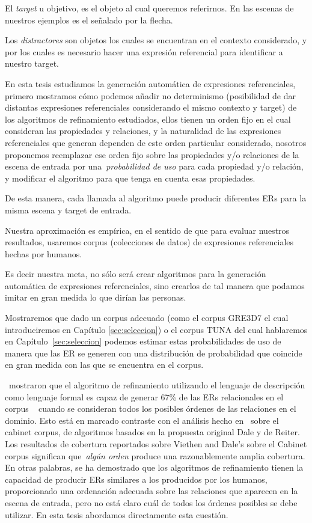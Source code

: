 El \emph{target} u objetivo, es el objeto al cual queremos referirnos. En las escenas de nuestros ejemplos es el se\~nalado por la flecha.

Los \emph{distractores} son objetos los cuales se encuentran en el contexto considerado, y por los cuales es necesario hacer una expresi\'on referencial para identificar a nuestro target. 

En esta tesis estudiamos la generaci\'on autom\'atica de expresiones referenciales, 
primero mostramos c\'omo podemos a\~nadir no determinismo (posibilidad de dar distantas expresiones referenciales considerando el mismo contexto y target) de los algoritmos de refinamiento estudiados, ellos tienen un orden fijo en el cual consideran las propiedades y relaciones, y la naturalidad de las expresiones referenciales que generan dependen de este orden particular considerado, nosotros proponemos reemplazar ese orden fijo
sobre las propiedades y/o relaciones de la escena de entrada por una~\emph{probabilidad de uso} para cada propiedad y/o relaci\'on, y modificar el algoritmo para que tenga en cuenta esas propiedades.

De esta manera, cada llamada al algoritmo puede producir diferentes ERs para la misma escena y target de entrada. 

Nuestra aproximaci\'on es emp\'irica, en el sentido de que para evaluar nuestros resultados, usaremos corpus (colecciones de datos) de expresiones referenciales hechas por humanos.

Es decir nuestra meta, no s\'olo ser\'a crear algoritmos para la generaci\'on autom\'atica de expresiones referenciales, sino crearlos de tal manera que podamos imitar en gran medida lo que dir\'ian las personas.

Mostraremos que dado un corpus adecuado (como el corpus GRE3D7 el cual introduciremos en Cap\'itulo \ref{sec:seleccion}) o el corpus TUNA del cual hablaremos en Cap\'itulo~\ref{sec:seleccion} podemos estimar estas probabilidades de uso de manera que las ER se generen con una distribuci\'on de probabilidad que coincide en gran medida con las que se encuentra en el corpus.


\cite{arec2:2008:Areces}~mostraron que el algoritmo de refinamiento utilizando el lenguaje de descripci\'on \el como lenguaje formal es capaz de generar 67\% de
las ERs relacionales en el corpus ~\cite{viethen06:_algor_for_gener_refer_expres} cuando se consideran todos los posibles \'ordenes de las relaciones en el dominio. Esto est\'a en marcado contraste con el an\'alisis hecho en~\cite{viethen06:_algor_for_gener_refer_expres} sobre el cabinet corpus, de algoritmos basados en la propuesta original Dale y de Reiter.
Los resultados de cobertura reportados sobre Viethen and 
Dale's sobre el Cabinet corpus significan que~\emph{alg\'un orden} produce una razonablemente amplia cobertura. En otras palabras, se ha demostrado que los algoritmos de refinamiento tienen la capacidad de producir ERs similares a los producidos por los humanos, proporcionado una ordenaci\'on adecuada sobre las relaciones que aparecen
en la escena de entrada, pero no est\'a claro cu\'al de todos los \'ordenes posibles se debe utilizar. En esta tesis abordamos directamente esta cuesti\'on.

